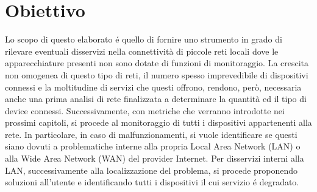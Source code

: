 









\section{Obiettivo}

Lo scopo di questo elaborato \'e quello di fornire uno strumento in grado di rilevare eventuali disservizi nella connettivit\`a di piccole reti locali dove le apparecchiature presenti non sono dotate di funzioni di monitoraggio.
La crescita non omogenea di questo tipo di reti, il numero spesso imprevedibile di dispositivi connessi e la moltitudine di servizi che questi offrono, rendono, per\`o, necessaria anche una prima analisi di rete finalizzata a determinare la quantit\`a ed il tipo di device connessi.
Successivamente, con metriche che verranno introdotte nei prossimi capitoli, si procede al monitoraggio di tutti i dispositivi appartenenti alla rete. 
In particolare, in caso di malfunzionamenti, si vuole identificare se questi siano dovuti a problematiche interne alla propria Local Area Network (LAN) o alla Wide Area Network (WAN) del provider Internet.
Per disservizi interni alla LAN, successivamente alla localizzazione del problema, si procede proponendo soluzioni all'utente e identificando tutti i dispositivi il cui servizio \'e degradato.


